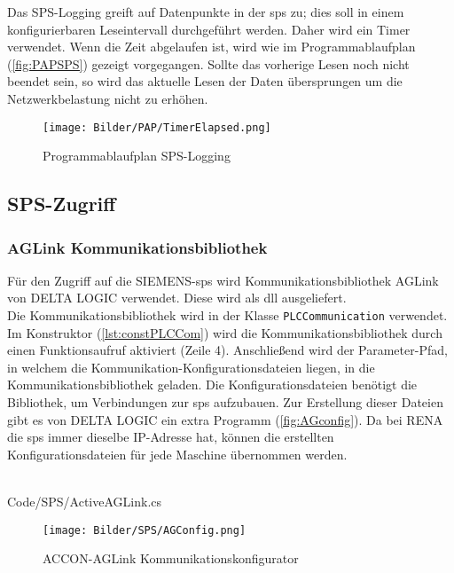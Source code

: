 Das SPS-Logging greift auf Datenpunkte in der \ac{sps} zu; dies soll in einem konfigurierbaren Leseintervall durchgeführt werden. Daher wird ein Timer verwendet. Wenn die Zeit abgelaufen ist, wird wie im Programmablaufplan (\autoref{fig:PAPSPS}) gezeigt vorgegangen. Sollte das vorherige Lesen noch nicht beendet sein, so wird das aktuelle Lesen der Daten übersprungen um die Netzwerkbelastung nicht zu erhöhen. 
\begin{figure}
\centering
 \texttt{[image: Bilder/PAP/TimerElapsed.png]}
 \caption[Programmablaufplan SPS-Logging]{Programmablaufplan SPS-Logging}
 \label{fig:PAPSPS}
\end{figure}


\subsection{SPS-Zugriff}

\subsubsection{AGLink Kommunikationsbibliothek}
Für den Zugriff auf die SIEMENS-\ac{sps} wird Kommunikationsbibliothek AGLink von DELTA LOGIC verwendet. Diese wird als \ac{dll} ausgeliefert. 
\ \\
Die Kommunikationsbibliothek wird in der Klasse \texttt{PLCCommunication} verwendet. Im Konstruktor (\autoref{lst:constPLCCom}) wird die Kommunikationsbibliothek durch einen Funktionsaufruf aktiviert (Zeile 4). Anschließend wird der Parameter-Pfad, in welchem die Kommunikation-Konfigurationsdateien liegen, in die Kommunikationsbibliothek geladen. Die Konfigurationsdateien benötigt die Bibliothek, um Verbindungen zur \ac{sps} aufzubauen. Zur Erstellung dieser Dateien gibt es von DELTA LOGIC ein extra Programm (\autoref{fig:AGconfig}). Da bei RENA die \ac{sps} immer dieselbe IP-Adresse hat, können die erstellten Konfigurationsdateien für jede Maschine übernommen werden. 
\ \\
\begin{minipage}{\textwidth}
\ \\
 {Code/SPS/ActiveAGLink.cs}
\ \\
\end{minipage}


\begin{figure}
\centering
 \texttt{[image: Bilder/SPS/AGConfig.png]}
 \caption[ACCON-AGLink Kommunikationskonfigurator]{ACCON-AGLink Kommunikationskonfigurator}
 \label{fig:AGconfig}
\end{figure}

